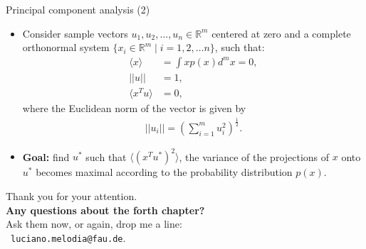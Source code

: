 \documentclass[aspectratio=169,t]{beamer}
\begin{document}
  {
    \begin{frame}{Principal component analysis (2)}
    \begin{itemize}
    \item Consider sample vectors $u_1, u_2, \ldots, u_n \in \mathbb{R}^m$ centered at zero and a complete orthonormal system $\{x_i \in \mathbb{R}^m \; \vert \; i = 1, 2, \ldots n\}$, such that:
    \begin{align}
      \langle x \rangle &= \int x p(x) d^m x = 0,\\
      \vert\vert u \vert\vert &= 1,\\
      \langle x^{T}u \rangle &= 0,
    \end{align}
    where the Euclidean norm of the vector is given by
    \begin{align}
      \vert\vert u_i \vert\vert = \left(\sum_{i=1}^{m} u_i^2\right)^\frac{1}{2}.
    \end{align}
      \item \textbf{Goal:} find $u^*$ such that $\langle (x^{T}u^*)^2 \rangle$, the variance of the projections of $x$ onto $u^*$ becomes maximal according to the probability distribution $p(x)$.
    \end{itemize}
    \end{frame}
  }

  { %
    \begin{frame}[c]
      \begin{center}
        Thank you for your attention.\\
        {\bf Any questions about the forth chapter?}\\[0.5cm]
        Ask them now, or again, drop me a line: \\ 
        \faSendO \ \texttt{luciano.melodia@fau.de}.
      \end{center}
    \end{frame}
  }
\end{document}
